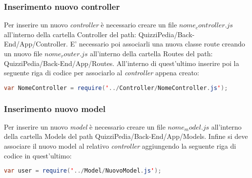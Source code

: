 \subsubsection{Inserimento nuovo controller}
Per inserire un nuovo \textit{controller} è necessario creare un file $nome_controller.js$ all'interno della cartella Controller del path: QuizziPedia/Back-End/App/Controller. E' necessario poi associarli una nuova classe route creando un nuovo file $nome_router.js$ all'interno della cartella Routes del path: QuizziPedia/Back-End/App/Routes. All'interno di quest'ultimo inserire poi la seguente riga di codice per associarlo al \textit{controller} appena creato:
\begin{lstlisting}[language=Java,firstnumber=1]
var NomeController = require('../Controller/NomeController.js');
\end{lstlisting}

\subsubsection{Inserimento nuovo model}
Per inserire un nuovo \textit{model} è necessario creare un file $nome_model.js$ all'interno della cartella Models del path QuizziPedia/Back-End/App/Models. Infine si deve associare il nuovo model al relativo \textit{controller} aggiungendo la seguente riga di codice in quest'ultimo:
\begin{lstlisting}[language=Java,firstnumber=1]
var user = require('../Model/NuovoModel.js');
\end{lstlisting}